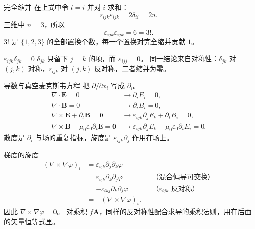 \documentclass[fontset=windows, chinese, 10pt, xcolor=dvipsnames]{beamer}
\begin{document}
\begin{frame}{完全缩并}
  在上式中令 $l=i$ 并对 $i$ 求和：
  \begin{equation*}
    \varepsilon_{ijk}\varepsilon_{ijk}
    =2\delta_{ii}
    =2n.
  \end{equation*}
  三维中 $n=3$，所以
  \begin{equation*}
    \varepsilon_{ijk}\varepsilon_{ijk}=6=3!.
  \end{equation*}
  $3!$ 是 $\{1,2,3\}$ 的全部置换个数，每一个置换对完全缩并贡献 $1$。
\end{frame}

\begin{frame}{$\varepsilon_{ijk}\delta_{jk}=0$}
  $\delta_{jk}$ 只留下 $j=k$ 的项，而 $\varepsilon_{ijj}=0$。
  同一结论来自对称性：$\delta_{jk}$ 对 $(j,k)$ 对称，$\varepsilon_{ijk}$ 对 $(j,k)$ 反对称，二者缩并为零。
\end{frame}

\begin{frame}{导数与真空麦克斯韦方程}
  把 $\partial/\partial x_i$ 写成 $\partial_i$。
  \begin{align*}
    \nabla\cdot\mathbf{E}=0
    &\longrightarrow \partial_i E_i=0,\\
    \nabla\cdot\mathbf{B}=0
    &\longrightarrow \partial_i B_i=0,\\
    \nabla\times\mathbf{E}+\partial_t\mathbf{B}=\mathbf{0}
    &\longrightarrow
      \varepsilon_{ijk}\partial_j E_k+\partial_t B_i=0,\\
    \nabla\times\mathbf{B}
    -\mu_0\varepsilon_0\partial_t\mathbf{E}=\mathbf{0}
    &\longrightarrow
      \varepsilon_{ijk}\partial_j B_k
      -\mu_0\varepsilon_0\partial_t E_i=0.
  \end{align*}
  散度是 $\partial_i$ 与场的重复指标，旋度是 $\varepsilon_{ijk}\partial_j$ 作用在场上。
\end{frame}

\begin{frame}{梯度的旋度}
  \small
  \begin{align*}
    (\nabla\times\nabla\varphi)_i
    &= \varepsilon_{ijk}\partial_j\partial_k\varphi \\
    &= \varepsilon_{ijk}\partial_k\partial_j\varphi
      && \text{（混合偏导可交换）}\\
    &= -\varepsilon_{ikj}\partial_k\partial_j\varphi
      && \text{（$\varepsilon_{ijk}$ 反对称）}\\
    &= -(\nabla\times\nabla\varphi)_i.
  \end{align*}
  \normalsize
  因此 $\nabla\times\nabla\varphi=\mathbf{0}$。
  对乘积 $f\mathbf{A}$，同样的反对称性配合求导的乘积法则，用在后面的矢量恒等式里。
\end{frame}
\end{document}
